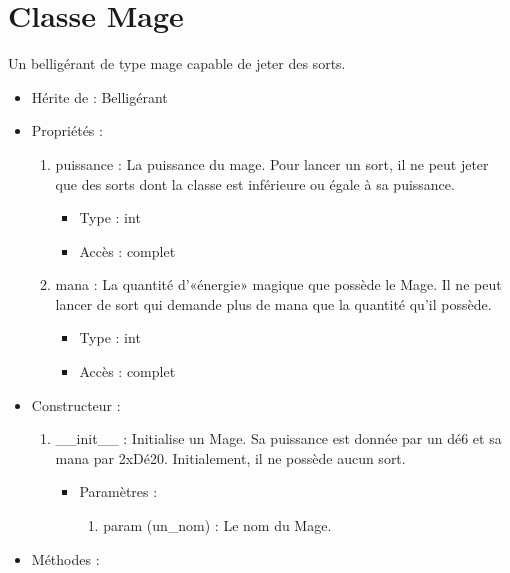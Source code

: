 \documentclass[12pt,pdftex,oneside]{article}
\begin{document}
  \section {Classe Mage}

  Un belligérant de type mage capable de jeter des sorts.

  \begin{itemize}
  \item Hérite de : Belligérant
  \item Propriétés : 
    \begin{enumerate}
    \item puissance : La puissance du mage. Pour lancer un sort, il ne peut
      jeter que des sorts dont la classe est inférieure ou égale à sa puissance.
          \begin{itemize}
          \item Type : int
          \item Accès : complet
          \end{itemize}
    \item mana : La quantité d'«énergie» magique que possède le Mage. Il ne peut
      lancer de sort qui demande plus de mana que la quantité qu'il possède.
          \begin{itemize}
          \item Type : int
          \item Accès : complet
          \end{itemize}

    \end{enumerate}

  \item Constructeur : 

  \begin{enumerate}
  \item \_\_init\_\_ : Initialise un Mage. Sa puissance est donnée par un dé6 et
    sa mana par 2xDé20. Initialement, il ne possède aucun sort.
    \begin{itemize}
    \item Paramètres : 
      \begin{enumerate}
      \item param (un\_nom) : Le nom du Mage.
      \end{enumerate}
    \end{itemize}

  \end{enumerate}

  \item Méthodes : 


\end{itemize}
\end{document}
